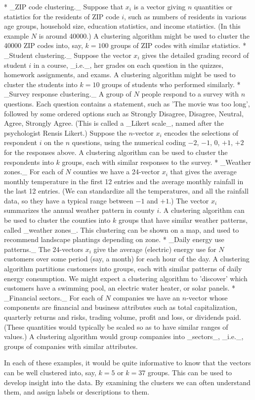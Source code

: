 * _ZIP code clustering._ Suppose that \(x_{i}\) is a vector giving \(n\) quantities or statistics for the residents of ZIP code \(i\), such as numbers of residents in various age groups, household size, education statistics, and income statistics. (In this example \(N\) is around 40000.) A clustering algorithm might be used to cluster the 40000 ZIP codes into, say, \(k=100\) groups of ZIP codes with similar statistics.
* _Student clustering._ Suppose the vector \(x_{i}\) gives the detailed grading record of student \(i\) in a course, _i.e._, her grades on each question in the quizzes, homework assignments, and exams. A clustering algorithm might be used to cluster the students into \(k=10\) groups of students who performed similarly.
* _Survey response clustering._ A group of \(N\) people respond to a survey with \(n\) questions. Each question contains a statement, such as 'The movie was too long', followed by some ordered options such as Strongly Disagree, Disagree, Neutral, Agree, Strongly Agree. (This is called a _Likert scale_, named after the psychologist Rensis Likert.) Suppose the \(n\)-vector \(x_{i}\) encodes the selections of respondent \(i\) on the \(n\) questions, using the numerical coding \(-2\), \(-1\), \(0\), \(+1\), \(+2\) for the responses above. A clustering algorithm can be used to cluster the respondents into \(k\) groups, each with similar responses to the survey.
* _Weather zones._ For each of \(N\) counties we have a 24-vector \(x_{i}\) that gives the average monthly temperature in the first 12 entries and the average monthly rainfall in the last 12 entries. (We can standardize all the temperatures, and all the rainfall data, so they have a typical range between \(-1\) and \(+1\).) The vector \(x_{i}\) summarizes the annual weather pattern in county \(i\). A clustering algorithm can be used to cluster the counties into \(k\) groups that have similar weather patterns, called _weather zones_. This clustering can be shown on a map, and used to recommend landscape plantings depending on zone.
* _Daily energy use patterns._ The 24-vectors \(x_{i}\) give the average (electric) energy use for \(N\) customers over some period (say, a month) for each hour of the day. A clustering algorithm partitions customers into groups, each with similar patterns of daily energy consumption. We might expect a clustering algorithm to 'discover' which customers have a swimming pool, an electric water heater, or solar panels.
* _Financial sectors._ For each of \(N\) companies we have an \(n\)-vector whose components are financial and business attributes such as total capitalization, quarterly returns and risks, trading volume, profit and loss, or dividends paid. (These quantities would typically be scaled so as to have similar ranges of values.) A clustering algorithm would group companies into _sectors_, _i.e._, groups of companies with similar attributes.

In each of these examples, it would be quite informative to know that the vectors can be well clustered into, say, \(k=5\) or \(k=37\) groups. This can be used to develop insight into the data. By examining the clusters we can often understand them, and assign labels or descriptions to them.

 